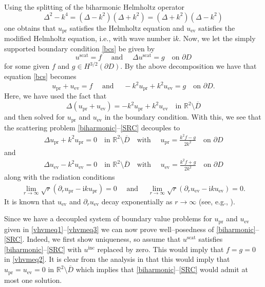 \documentclass{article}
\newcommand{\pdr}{\partial_r}
\newcommand{\exD}{\mathbb{R}^2 \setminus \overline{D}}
\numberwithin{equation}{section}
\begin{document}
Using the splitting of the biharmonic Helmholtz operator
$$\Delta^2 - k^4 = (\Delta-k^2)(\Delta+k^2)=(\Delta + k^2)(\Delta - k^2)$$
one obtains that $u_\textrm{pr}$ satisfies the Helmholtz equation and $u_\textrm{ev}$ satisfies the modified Helmholtz equation, i.e., with wave number $\mathrm{i}k$. Now, we let the simply supported boundary condition \eqref{bcs} be given by 
$$u^{\text{scat}} = f  \quad \text{ and } \quad \Delta{u^{\text{scat}}} =g \quad \text{on $\partial D$}$$
for some given $f$ and $g \in H^{3/2}(\partial D)$. By the above decomposition we have that equation \eqref{bcs} becomes 
$$u_\textrm{pr} + u_\textrm{ev} = f  \quad \text{ and } \quad  -k^2 u_\textrm{pr} + k^2 u_\textrm{ev} = g \quad \text{on $\partial D$}.$$
Here, we have used the fact that 
$$\Delta(u_\textrm{pr} + u_\textrm{ev}  ) = -k^2 u_\textrm{pr} + k^2 u_\textrm{ev} \quad \text{in } \exD$$ 
and then solved for $u_\textrm{pr}$ and $u_\textrm{ev} $ in the boundary condition. With this, we see that the scattering problem \eqref{biharmonic}--\eqref{SRC} decouples to 
\begin{align}
\Delta u_\textrm{pr} + k^2 u_\textrm{pr} = 0\quad \text{in } \exD \quad \text{with } \quad   u_\textrm{pr} = \frac{k^2 f - g}{2k^2} \quad \text{on } \partial D 
\label{vhvmeq1}  
\end{align}
and 
\begin{align}
\Delta u_\textrm{ev} - k^2 u_\textrm{ev} = 0\quad \text{in } \exD \quad \text{with } \quad   u_\textrm{ev} = \frac{k^2 f + g}{2k^2} \quad \text{on } \partial D \label{vhvmeq2}  
\end{align}
along with the radiation conditions 
\begin{align}
\lim_{r \to \infty} \sqrt{r}(\pdr{u_\textrm{pr}} - \text{i}ku_\textrm{pr}) = 0 \quad \text{ and }  \quad   \lim_{r \to \infty} \sqrt{r}(\pdr{u_\textrm{ev}} - \text{i}ku_\textrm{ev}) = 0. \label{vhvmeq3}
\end{align}
It is known that $u_\textrm{ev} $ and $\partial_r u_\textrm{ev} $ decay exponentially as $r \to \infty$ (see, e.g., \cite{DongLi24,DSM-BH24}). 

Since we have a decoupled system of boundary value problems for $u_\textrm{pr}$ and $u_\textrm{ev}$ given in \eqref{vhvmeq1}--\eqref{vhvmeq3} we can now prove well--posedness of \eqref{biharmonic}--\eqref{SRC}. Indeed, we first show uniqueness, so assume that $u^{\text{scat}}$ satisfies \eqref{biharmonic}--\eqref{SRC} with $u^{\text{inc}}$ replaced by zero. This would imply that $f=g=0$ in \eqref{vhvmeq2}. It is clear from the analysis in \cite[Chapter 5]{Cakoni-Colton-book} that this would imply that $u_\textrm{pr}=u_\textrm{ev}=0$ in $\exD$ which implies that \eqref{biharmonic}--\eqref{SRC} would admit at most one solution. 
\end{document}
